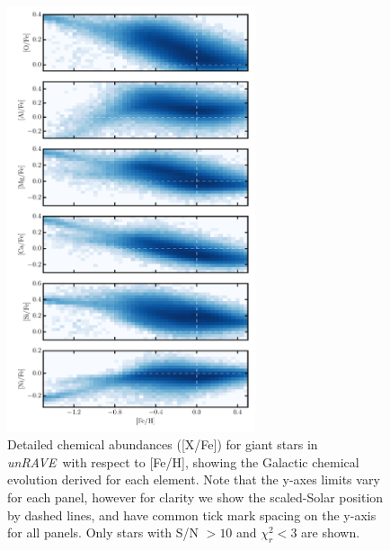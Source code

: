 \documentclass[preprint,trackchanges]{aastex}
\newcommand{\project}[1]{\textsl{#1}}
\newcommand{\unrave}{\project{unRAVE}}
\begin{document}
\begin{figure}[p]
\center
\includegraphics[width=0.65\textwidth]{figures/gce.pdf}
\caption{Detailed chemical abundances ([X/Fe]) for giant stars in \unrave\ with respect to [Fe/H], showing the Galactic chemical evolution derived for each element. Note that the y-axes limits vary for each panel, however for clarity we show the scaled-Solar position by dashed lines, and have common tick mark spacing on the y-axis for all panels. Only stars with S/N $> 10$ and $\chi_r^2 < 3$ are shown.\label{fig:gce}}
\end{figure}
\end{document}
